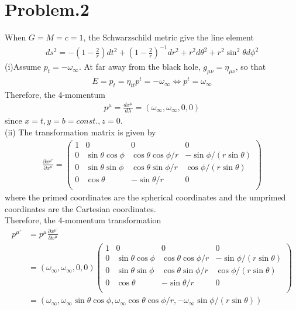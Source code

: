 \documentclass[12pt]{article}
\begin{document}
\section*{Problem.2}
When $G =M =c = 1$, the Schwarzschild metric give the line element
\begin{align}
ds^2 = - \left(1 - \frac{2}{r}\right) dt^2 +\left(1 - \frac{2}{r}\right)^{-1} dr^2 + r^2 d \theta^{2} + r^2 \sin^{2}{\theta} d \phi^{2}
\end{align}
(i)Assume $p_{t} = - \omega_{\infty}$. At far away from the black hole, $g_{\mu \nu} = \eta_{\mu \nu}$, so that
\begin{align}
E = p_{t} = \eta_{t t} p^{t} = - \omega_{\infty} \Leftrightarrow p^{t} = \omega_{\infty}
\end{align}
Therefore, the 4-momentum
\begin{align}
p^{\mu} = \frac{d x^{\mu}}{d \lambda} = \left( \omega_{\infty}, \omega_{\infty}, 0, 0 \right)
\end{align}
since $x = t, y = b = const., z = 0$.\\
(ii)
The transformation matrix is given by
\begin{align}
\frac{\partial x^{\mu'}}{\partial x^{\mu}} =
\begin{pmatrix}
 1 & 0 & 0 & 0 \\
 0 & \sin{\theta} \cos{\phi} & \cos{\theta} \cos{\phi}/ r & - \sin{\phi}/\left(r \sin{\theta}\right) \\
 0 & \sin{\theta} \sin{\phi} & \cos{\theta} \sin{\phi}/r & \cos{\phi}/\left(r \sin{\theta}\right) \\
 0 & \cos{\theta} & - \sin{\theta}/r & 0 \\
\end{pmatrix}
\end{align}
where the primed coordinates are the spherical coordinates and the umprimed coordinates are the Cartesian coordinates.\\
Therefore, the 4-momentum transformation
\begin{align}
p^{\mu'} &= p^{\mu} \frac{\partial x^{\mu'}}{\partial x^{\mu}}\\
&=
\left( \omega_{\infty}, \omega_{\infty}, 0, 0 \right)
\begin{pmatrix}
 1 & 0 & 0 & 0 \\
 0 & \sin{\theta} \cos{\phi} & \cos{\theta} \cos{\phi}/ r & - \sin{\phi}/\left(r \sin{\theta}\right) \\
 0 & \sin{\theta} \sin{\phi} & \cos{\theta} \sin{\phi}/r & \cos{\phi}/\left(r \sin{\theta}\right) \\
 0 & \cos{\theta} & - \sin{\theta}/r & 0 \\
\end{pmatrix}
\\
&= \left( \omega_{\infty}, \omega_{\infty} \sin{\theta} \cos{\phi}, \omega_{\infty} \cos{\theta} \cos{\phi}/ r, - \omega_{\infty} \sin{\phi}/\left(r \sin{\theta}\right) \right)
\end{align}
\end{document}
